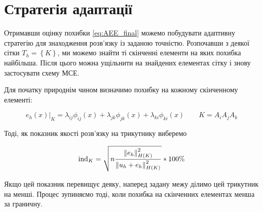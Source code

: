 
\section{Стратегія адаптації}

Отримавши оцінку похибки \eqref{eq:AEE_final} можемо побудувати адаптивну стратегію для знаходження розв'язку із заданою точністю.
Розпочавши з деякої сітки $T_h =  \left\{ K \right\}$, ми можемо знайти ті скінченні елементи на яких похибка найбільша.
Після цього можна ущільнити на знайдених елементах сітку і знову застосувати схему МСЕ.

Для початку природнім чином визначимо похибку на кожному скінченному елементі:

\newcommand{\error}[1]{\lambda_{#1} \phi_{#1}(x)}
\begin{equation}\label{eq:error_element}
	e_h(x)|_K = \error{ij}+\error{jk}+\error{ki} \qquad K = A_iA_jA_k
\end{equation}

Тоді, як показник якості розв'язку на трикутнику виберемо

\begin{equation}\label{eq:error_indicator}
	\text{ind}_K = \sqrt{n \frac
			{\left\lVert e_h\right\rVert^2_{H(K)}}
			{\left\lVert u_h+e_h\right\rVert^2_{H(K)}}
	}*100\%
\end{equation}

Якщо цей показник перевищує деяку, наперед задану межу ділимо цей трикутник на менші.
Процес зупиняємо тоді, коли похибка на скінченних елементах менша за граничну.

\undef{\error}
